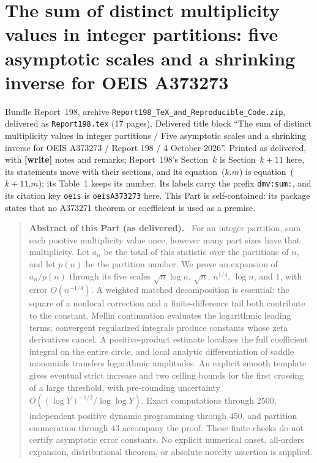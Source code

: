 \documentclass[11pt,letterpaper]{article}
\numberwithin{equation}{section}
\theoremstyle{definition}\newtheorem{definition}[theorem]{Definition}
\theoremstyle{remark}\newtheorem{remark}[theorem]{Remark}
\newcommand{\file}[1]{\nolinkurl{#1}}
\newenvironment{partabstract}{\begin{quote}\small\noindent\textbf{Abstract of this Part (as delivered).}\ }{\end{quote}}
\newcommand{\partsource}[1]{\par\noindent\begin{minipage}{\textwidth}\small #1\end{minipage}\par\medskip}
\begin{document}
\part{The sum of distinct multiplicity values in integer partitions: five asymptotic scales and a shrinking inverse for OEIS A373273}\label{dmv:sum:part}
\partsource{Bundle Report~198, archive \file{Report198_TeX_and_Reproducible_Code.zip}, delivered as \file{Report198.tex} (17 pages). Delivered title block ``The sum of distinct multiplicity values in integer partitions / Five asymptotic scales and a shrinking inverse for OEIS A373273 / Report 198 / 4 October 2026''. Printed as delivered, with \textbf{[write]} notes and remarks; Report~198's Section~$k$ is Section~$k+11$ here, its statements move with their sections, and its equation~($k.m$) is equation~($k{+}11.m$); its Table~1 keeps its number. Its labels carry the prefix \file{dmv:sum:}, and its citation key \file{oeis} is \file{oeisA373273} here. This Part is self-contained: its package states that no A373271 theorem or coefficient is used as a premise.}
\begin{partabstract}
For an integer partition, sum each positive multiplicity value once, however many part sizes have that multiplicity. Let $a_n$ be the total of this statistic over the partitions of $n$, and let $p(n)$ be the partition number. We prove an expansion of $a_n/p(n)$ through its five scales $\sqrt n\log n$, $\sqrt n$, $n^{1/4}$, $\log n$, and $1$, with error $O(n^{-1/4})$. A weighted matched decomposition is essential: the square of a nonlocal correction and a finite-difference tail both contribute to the constant. Mellin continuation evaluates the logarithmic leading terms; convergent regularized integrals produce constants whose zeta derivatives cancel. A positive-product estimate localizes the full coefficient integral on the entire circle, and local analytic differentiation of saddle monomials transfers logarithmic amplitudes. An explicit smooth template gives eventual strict increase and two ceiling bounds for the first crossing of a large threshold, with pre-rounding uncertainty $O((\log Y)^{-1/2}/\log\log Y)$. Exact computations through $2500$, independent positive dynamic programming through $450$, and partition enumeration through $43$ accompany the proof. These finite checks do not certify asymptotic error constants. No explicit numerical onset, all-orders expansion, distributional theorem, or absolute novelty assertion is supplied.
\end{partabstract}
\end{document}
